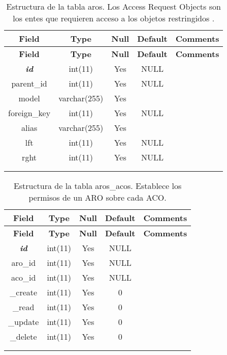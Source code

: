%
%
\begin{longtable}{c c c c l}
	\multicolumn{1}{c}{\textbf{Field}} &
	\multicolumn{1}{c}{\textbf{Type}} &
	\multicolumn{1}{c}{\textbf{Null}} &
	\multicolumn{1}{c}{\textbf{Default}} &
	\multicolumn{1}{c}{\textbf{Comments}} \\ \hline \hline
\endfirsthead
	\multicolumn{1}{c}{\textbf{Field}} &
	\multicolumn{1}{c}{\textbf{Type}} &
	\multicolumn{1}{c}{\textbf{Null}} &
	\multicolumn{1}{c}{\textbf{Default}} &
	\multicolumn{1}{c}{\textbf{Comments}} \\ \hline \hline
\endhead \endfoot
	\textbf{\textit{id}} & int(11) & Yes & NULL \\ \hline 
	parent\_id & int(11) & Yes & NULL \\ \hline 
	model & varchar(255) & Yes &  \\ \hline 
	foreign\_key & int(11) & Yes & NULL \\ \hline 
	alias & varchar(255) & Yes &  \\ \hline 
	lft & int(11) & Yes & NULL \\ \hline 
	rght & int(11) & Yes & NULL \\ \\ 
\caption[Estructura de la tabla aros]{Estructura de la tabla aros. Los Access Request Objects son los entes que requieren acceso a los objetos restringidos \citep{CakePHP_ACL_2008}.} \label{tab:aros-structure} \\ 
\end{longtable}

%
%
\begin{longtable}{c c c c l}
	\multicolumn{1}{c}{\textbf{Field}} &
	\multicolumn{1}{c}{\textbf{Type}} &
	\multicolumn{1}{c}{\textbf{Null}} &
	\multicolumn{1}{c}{\textbf{Default}} &
	\multicolumn{1}{c}{\textbf{Comments}} \\ \hline \hline
\endfirsthead
	\multicolumn{1}{c}{\textbf{Field}} &
	\multicolumn{1}{c}{\textbf{Type}} &
	\multicolumn{1}{c}{\textbf{Null}} &
	\multicolumn{1}{c}{\textbf{Default}} &
	\multicolumn{1}{c}{\textbf{Comments}} \\ \hline \hline
\endhead \endfoot
	\textbf{\textit{id}} & int(11) & Yes & NULL \\ \hline
	aro\_id & int(11) & Yes & NULL \\ \hline 
	aco\_id & int(11) & Yes & NULL \\ \hline 
	\_create & int(11) & Yes & 0 \\ \hline 
	\_read & int(11) & Yes & 0 \\ \hline 
	\_update & int(11) & Yes & 0 \\ \hline 
	\_delete & int(11) & Yes & 0 \\ \\ 
\caption[Estructura de la tabla aros\_acos]{Estructura de la tabla aros\_acos. Establece los permisos de un ARO sobre cada ACO.} \label{tab:aros_acos-structure} \\ 
\end{longtable}


